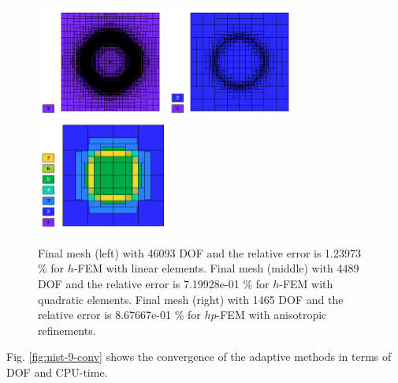 \documentclass[12pt]{elsarticle}
\begin{document}
\begin{figure}[H]
\centering
\includegraphics[height=3.7cm]{nist/nist-9/mesh_h1_aniso.png}
\includegraphics[height=3.7cm]{nist/nist-9/mesh_h2_aniso.png}
\includegraphics[height=3.7cm]{nist/nist-9/mesh_hp_aniso.png}
\caption{
Final mesh (left) with 46093 DOF and the relative error is 1.23973 \% for $h$-FEM with linear elements.
Final mesh (middle) with 4489 DOF and the relative error is 7.19928e-01 \% for $h$-FEM with quadratic elements.
Final mesh (right) with 1465 DOF and the relative error is 8.67667e-01 \% for $hp$-FEM with anisotropic refinements.}
\label{fig:nist-9-hp-aniso}
\end{figure}

Fig. \ref{fig:nist-9-conv} shows the convergence of the adaptive methods in terms of DOF and CPU-time.
\end{document}
